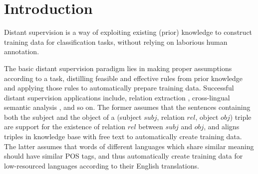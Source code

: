 \section{Introduction}




Distant supervision is a way of exploiting existing (prior) knowledge to construct training data for classification tasks, without relying on laborious human annotation.

The basic distant supervision paradigm lies in making proper assumptions according to a task, distilling feasible and effective rules from prior knowledge and applying those rules to automatically prepare training data. Successful distant supervision applications include, relation extraction \cite{mintz2009distant}, cross-lingual semantic analysis \cite{fang2016learning}, and so on. The former assumes that the sentences containing both the subject and the object of a (subject $subj$, relation $rel$, object $obj$) triple are support for the existence of relation $rel$ between $subj$ and $obj$, and aligns triples in knowledge base with free text to automatically create training data. The latter assumes that words of different languages which share similar meaning should have similar POS tags, and thus automatically create training data for low-resourced languages according to their English translations.

